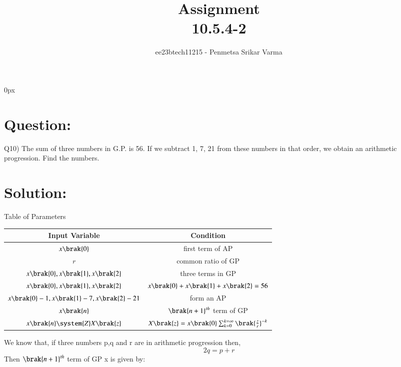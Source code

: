 \documentclass[beamer]{IEEEtran}
\theoremstyle{remark}
\begin{document}
\parindent 0px


\title{Assignment\\[1ex]10.5.4-2}
\author{ee23btech11215 - Penmetsa Srikar Varma$^{}$%
}
\maketitle
\newpage
\bigskip

\renewcommand{\thefigure}{\theenumi}
\renewcommand{\thetable}{\theenumi}
\section*{Question:}
Q10) The sum of three numbers in G.P. is 56. If we subtract 1, 7, 21 from these numbers in that order, we obtain an arithmetic progression. Find the numbers.
\section*{Solution:}
{\centering
Table of Parameters\\
}
\begin{table}[h]
    \centering
    \begin{tabular}{|c|c|}
        \hline
         Input Variable & Condition\\
        \hline
         $x\brak{0}$ & first term of AP\\
         \hline
         $r$ & common ratio of GP\\
         \hline
         $x\brak{0},x\brak{1},x\brak{2}$ & three terms in GP \\
         \hline
         $x\brak{0},x\brak{1},x\brak{2}$ & $x\brak{0}+x\brak{1}+x\brak{2}=56$ \\
         \hline
          $x\brak{0}-1,x\brak{1}-7,x\brak{2}-21$ & form an AP \\
         \hline
          $x\brak{n}$ & $\brak{n+1}^{th}$ term of GP \\
         \hline
         $x\brak{n}\system{Z}X\brak{z}$ & $X\brak{z}=x\brak{0}\sum_{k=0}^{k=\infty}\brak{\frac{z}{r}}^{-k}$\\
         \hline
    \end{tabular}
     \label{tab:t1}
\end{table}
We know that, if three numbers p,q and r are in arithmetic progression then,
\begin{equation}
\label{q1}
2q = p + r
\end{equation}
Then $\brak{n+1}^{th}$ term of GP x is given by:\\
\end{document}
